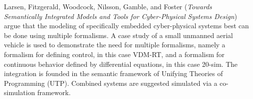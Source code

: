 


Larsen, Fitzgerald, Woodcock, Nilsson, Gamble, and Foster
\cite{isola-2016-larsen}
({\em Towards Semantically Integrated Models and Tools for
Cyber-Physical Systems Design})
argue that the modeling of specifically embedded 
cyber-physical systems best can be done using multiple 
formalisms. A case study of a small unmanned
aerial vehicle is used to demonstrate the need for multiple formalisms, namely a formalism for defining control, in this case VDM-RT, and a formalism for continuous behavior defined by differential equations, in this case 20-sim. The integration is founded in the semantic framework of Unifying Theories of Programming (UTP). Combined systems are suggested simulated via
a co-simulation framework.

